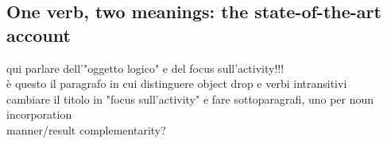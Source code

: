 
\subsection{One verb, two meanings: the state-of-the-art account} 

qui parlare dell'"oggetto logico" e del focus sull'activity!!!\\
è questo il paragrafo in cui distinguere object drop e verbi intransitivi\\
cambiare il titolo in "focus sull'activity" e fare sottoparagrafi, uno per noun incorporation\\
manner/result complementarity?

